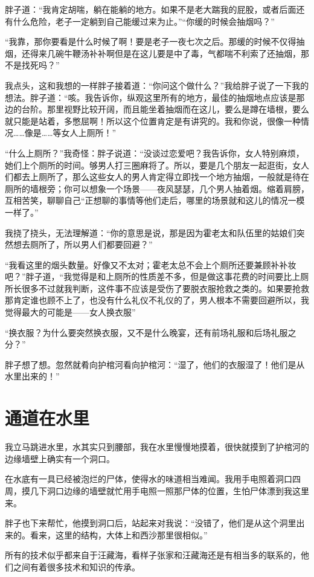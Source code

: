 胖子道：“我肯定胡喘，躺在能躺的地方。如果不是老大踹我的屁股，或者后面还有什么危险，老子一定躺到自己能缓过来为止。”“你缓的时候会抽烟吗？”

“我靠，那你要看是什么时候了啊！要是老子一夜七次之后。那缓的时候不仅得抽烟，还得来几碗牛鞭汤补补啊但是在这儿要是中了毒，气都喘不利索了还抽烟，那不是找死吗？”

我点头，这和我想的一样胖子接着道：“你问这个做什么？”我给胖子说了一下我的想法。胖子道：“咳。我告诉你，纵观这里所有的地方，最佳的抽烟地点应该是那边的台阶。那里视野比较开阔，而且能坐着抽烟而在这儿，要么是蹲在墙根，要么就只能是站着，多憋屈啊！所以这个位置肯定是有讲究的。我和你说，很像一种情况……像是……等女人上厕所！”

“什么上厕所？”我奇怪：胖子说道：“没谈过恋爱吧？我告诉你，女人特别麻烦，她们上个厕所的时间。够男人打三圈麻将了。所以，要是几个朋友一起逛街，女人们都去上厕所了，那么这些女人的男人肯定得立即找一个地方抽烟，一般就是待在厕所的墙根旁；你可以想象一个场景——夜风瑟瑟，几个男人抽着烟。缩着肩膀，互相苦笑，聊聊自己“正想聊的事情等他们走后，哪里的场景就和这儿的情况一模一样了。”

我挠了挠头，无法理解道：“你的意思是说，那是因为霍老太和队伍里的姑娘们突然想去厕所了，所以男人们都要回避？”

“我看这里的烟头数量。好像又不太对；霍老太总不会上个厕所还要兼顾补补妆吧？”胖子道，“我觉得是和上厕所的性质差不多，但是做这事花费的时间要比上厕所长很多不过就我判断，这件事不应该是受伤了要脱衣服抢救之类的。如果要抢救那肯定谁也顾不上了，也没有什么礼仪不礼仪的了，男人根本不需要回避所以，我觉得最大的可能是——女人换衣服”

“换衣服？为什么要突然换衣服，又不是什么晚宴，还有前场礼服和后场礼服之分？”

胖子想了想。忽然就肴向护棺河看向护棺河：“湿了，他们的衣服湿了！他们是从水里出来的！”

\chapter{通道在水里}

我立马跳进水里，水其实只到腰部，我在水里慢慢地摸着，很快就摸到了护棺河的边缘墙壁上确实有一个洞口。

在水底有一具已经被泡烂的尸体，使得水的味道相当难闻。我用手电照着洞口四周，摸几下洞口边缘的墙壁就忙用手电照一照那尸体的位置，生怕尸体漂到我这里来。

胖子也下来帮忙，他摸到洞口后，站起来对我说：“没错了，他们是从这个洞里出来的。看来，这里的结构，大体上和西沙那里很相似。”

所有的技术似乎都来自于汪藏海，看样子张家和汪藏海还是有相当多的联系的，他们之间有着很多技术和知识的传承。

